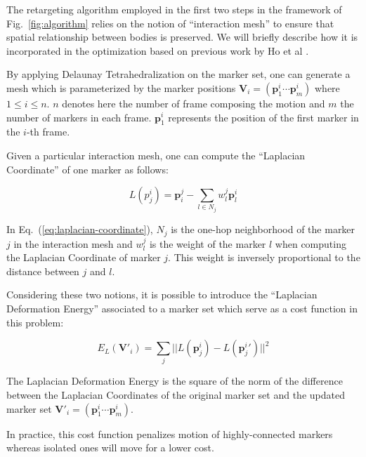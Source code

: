 \documentclass[letterpaper, 10 pt, conference]{ieeeconf}  %
\begin{document}
The retargeting algorithm employed in the first two steps in the
framework of Fig.~\ref{fig:algorithm} relies on 
the notion of ``interaction mesh'' to ensure that   
spatial relationship between bodies is preserved. 
We will briefly describe how it is incorporated in the optimization
based on previous work by Ho et al \cite{Komura10}. 

By applying Delaunay Tetrahedralization \cite{Si2005} on the marker
set, one can generate a mesh which is parameterized by the marker
positions $\mathbf{V}_i = (\mathbf{p}^i_1 \cdots \mathbf{p}^i_m)$
where $1 \leq i \leq n$. $n$ denotes here the number of frame
composing the motion and $m$ the number of markers in each
frame. $\mathbf{p}^i_1$ represents the position of the first marker in
the $i$-th frame.

Given a particular interaction mesh, one can compute the ``Laplacian
Coordinate'' of one marker as follows:

\begin{equation}\label{eq:laplacian-coordinate}
L(p^i_j) = \mathbf{p}_i^j - \sum_{l \in N_j} w^j_l \mathbf{p}^i_l
\end{equation}

In Eq.~(\ref{eq:laplacian-coordinate}), $N_j$ is the one-hop
neighborhood of the marker $j$ in the interaction mesh and $w^j_l$ is the
weight of the marker $l$ when computing the Laplacian Coordinate of
marker $j$. This weight is inversely proportional to the distance
between $j$ and $l$.

Considering these two notions, it is possible to introduce the
``Laplacian Deformation Energy'' associated to a marker set which
serve as a cost function in this problem:

\begin{equation}
E_L(\mathbf{V'}_i) = \sum_j || L(\mathbf{p}^i_j) -
L(\mathbf{p}^i_j{}') ||^2
\label{eq:laplace-energy}
\end{equation}

The Laplacian Deformation Energy is the square of the norm of the
difference between the Laplacian Coordinates of the original marker
set and the updated marker set $\mathbf{V}'_i = (\mathbf{p}^i_1 \cdots
\mathbf{p}^i_m)$.

In practice, this cost function penalizes motion of highly-connected
markers whereas isolated ones will move for a lower cost.

\end{document}
